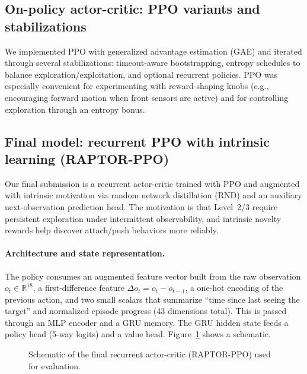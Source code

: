 \documentclass[11pt, oneside]{article}    %
\begin{document}
\subsection{On-policy actor-critic: PPO variants and stabilizations}
We implemented PPO \citep{schulman2017ppo} with generalized advantage estimation (GAE) \citep{schulman2016gae} and iterated through several stabilizations: timeout-aware bootstrapping, entropy schedules to balance exploration/exploitation, and optional recurrent policies. PPO was especially convenient for experimenting with reward-shaping knobs (e.g., encouraging forward motion when front sensors are active) and for controlling exploration through an entropy bonus.

\subsection{Final model: recurrent PPO with intrinsic learning (RAPTOR-PPO)}
Our final submission is a recurrent actor-critic trained with PPO and augmented with intrinsic motivation via random network distillation (RND) \citep{burda2019rnd} and an auxiliary next-observation prediction head. The motivation is that Level~2/3 require persistent exploration under intermittent observability, and intrinsic novelty rewards help discover attach/push behaviors more reliably.

\paragraph{Architecture and state representation.}
The policy consumes an augmented feature vector built from the raw observation $o_t\in\mathbb{R}^{18}$, a first-difference feature $\Delta o_t=o_t-o_{t-1}$, a one-hot encoding of the previous action, and two small scalars that summarize ``time since last seeing the target'' and normalized episode progress (43 dimensions total). This is passed through an MLP encoder and a GRU memory. The GRU hidden state feeds a policy head (5-way logits) and a value head. Figure~\ref{fig:arch} shows a schematic.

\begin{figure}[H]
\centering
{}
\caption{Schematic of the final recurrent actor-critic (RAPTOR-PPO) used for evaluation.}
\label{fig:arch}
\end{figure}
\end{document}
